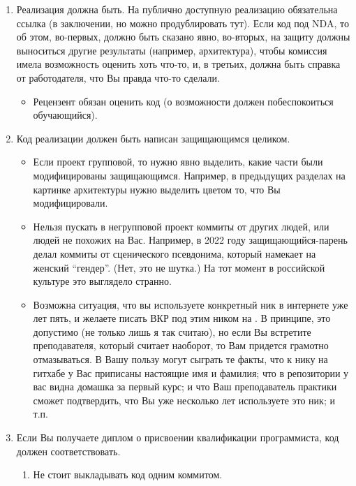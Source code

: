\begin{enumerate}
    \item Реализация должна быть. На публично доступную реализацию обязательна ссылка (в заключении, но можно продублировать тут).
          Если код под \textsc{NDA}, то об этом, во-первых, должно быть сказано явно,
          во-вторых, на защиту должны выно\-ситься другие результаты (например, архитектура), чтобы комис\-сия имела возможность оценить хоть что-то,
          и, в третьих, должна быть справка от работодателя, что Вы правда что-то сделали.
          \begin{itemize}
              \item Рецензент обязан оценить код (о возможности должен побеспо\-коиться обучающийся).
          \end{itemize}
    \item Код реализации должен быть написан защищающимся целиком.
          \begin{itemize}
              \item  Если проект групповой, то нужно явно выделить, какие части были модифицированы защищающимся. Например, в преды\-дущих разделах на картинке архитектуры нужно выделить цветом то, что Вы модифицировали.
              \item Нельзя пускать в негрупповой проект коммиты от других людей, или людей не похожих на Вас. Например, в 2022 году защищающийся-парень делал коммиты от сценического псев\-донима, который намекает на женский \enquote{гендер}. (Нет, это не шутка.) На тот момент в российской культуре это выглядело странно.
              \item Возможна ситуация, что вы используете конкретный ник в интернете уже лет пять, и желаете писать ВКР под этим ником на \GitHub{}. В принципе, это допустимо (не только лишь я так считаю), но если Вы встретите преподавателя, который считает наоборот, то Вам придется грамотно отмазы\-ваться. В Вашу пользу могут сыграть те факты, что к нику на гитхабе у Вас приписаны настоящие имя и фамилия; что в репозитории у вас видна домашка за первый курс; и что Ваш преподаватель практики сможет подтвердить, что Вы уже несколько лет используете это ник; и т.п.
          \end{itemize}
    \item Если Вы получаете диплом о присвоении квалификации программиста, код должен соответствовать.
          \begin{enumerate}
              \item Не стоит выкладывать код одним коммитом.

\end{enumerate}
\end{enumerate}
